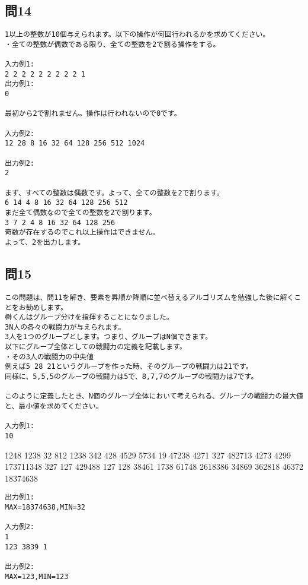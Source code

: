 \subsection{問14}
\begin{verbatim}
1以上の整数が10個与えられます。以下の操作が何回行われるかを求めてください。
・全ての整数が偶数である限り、全ての整数を2で割る操作をする。

入力例1:
2 2 2 2 2 2 2 2 2 1
出力例1:
0

最初から2で割れません。操作は行われないので0です。

入力例2:
12 28 8 16 32 64 128 256 512 1024

出力例2:
2

まず、すべての整数は偶数です。よって、全ての整数を2で割ります。
6 14 4 8 16 32 64 128 256 512
まだ全て偶数なので全ての整数を2で割ります。
3 7 2 4 8 16 32 64 128 256
奇数が存在するのでこれ以上操作はできません。
よって、2を出力します。
\end{verbatim}

\subsection{問15}
\begin{verbatim}
この問題は、問11を解き、要素を昇順か降順に並べ替えるアルゴリズムを勉強した後に解くことをお勧めします。
榊くんはグループ分けを指揮することになりました。
3N人の各々の戦闘力が与えられます。
3人を1つのグループとします。つまり、グループはN個できます。
以下にグループ全体としての戦闘力の定義を記載します。
・その3人の戦闘力の中央値
例えば5 28 21というグループを作った時、そのグループの戦闘力は21です。
同様に、5,5,5のグループの戦闘力は5で、8,7,7のグループの戦闘力は7です。

このように定義したとき、N個のグループ全体において考えられる、グループの戦闘力の最大値と、最小値を求めてください。

入力例1:
10
\end{verbatim}
1248 1238 32 812 1238 342 428 4529 5734 19 47238 4271 327 482713 4273 4299 173711348 327 127 429488 127 128 38461 1738 61748 2618386 34869 362818 46372 18374638
\begin{verbatim}
出力例1:
MAX=18374638,MIN=32

入力例2:
1
123 3839 1

出力例2:
MAX=123,MIN=123
\end{verbatim}

